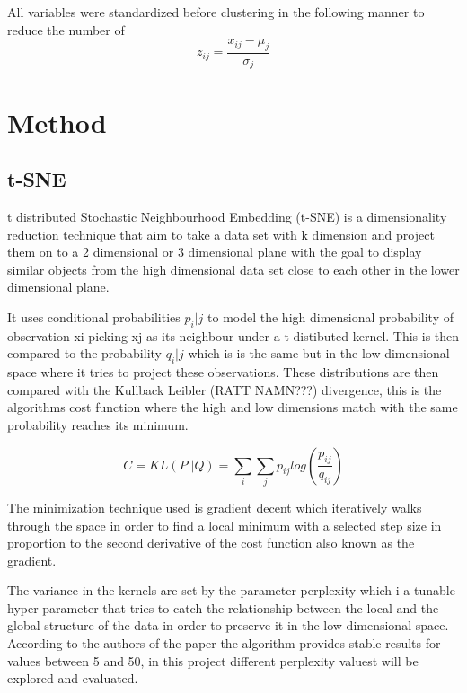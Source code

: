 \documentclass{article}
\begin{document}
 All variables were standardized before clustering in the following manner to reduce the number of 
 $$z_{ij} = \frac{x_{ij} - \mu_{j}}{\sigma_{j}}$$ 


\newpage


\section{Method}

\subsection{t-SNE}


t distributed Stochastic Neighbourhood Embedding (t-SNE) is a dimensionality reduction technique that aim to take a data set with k dimension and project them on to a 2 dimensional or 3 dimensional plane with the goal to display similar objects from the high dimensional data set close to each other in the lower dimensional plane. 

It uses conditional probabilities $p_i|j$ to model the high dimensional probability of observation xi picking xj as its neighbour under a t-distibuted kernel. This is then compared to the probability $q_i|j$  which is is the same but in the low dimensional space where it tries to project these observations. These distributions are then compared with the Kullback Leibler (RATT NAMN???) divergence, this is the algorithms cost function where the high and low dimensions match with the same probability reaches its minimum. 

$$C = KL(P||Q)=\sum_i\sum_jp_{ij}log(\frac{p_{ij}}{q_{ij}})$$

The minimization technique used is gradient decent which iteratively walks through the space in order to find a local minimum with a selected step size in proportion to the second derivative of the cost function also known as the gradient.

The variance in the kernels are set by the parameter perplexity which i a tunable hyper parameter that tries to catch the relationship between the local and the global structure of the data in order to preserve it in the low dimensional space. According to the authors of the paper the algorithm provides stable results for values between 5 and 50, in this project different perplexity valuest will be explored and evaluated. 
\end{document}
